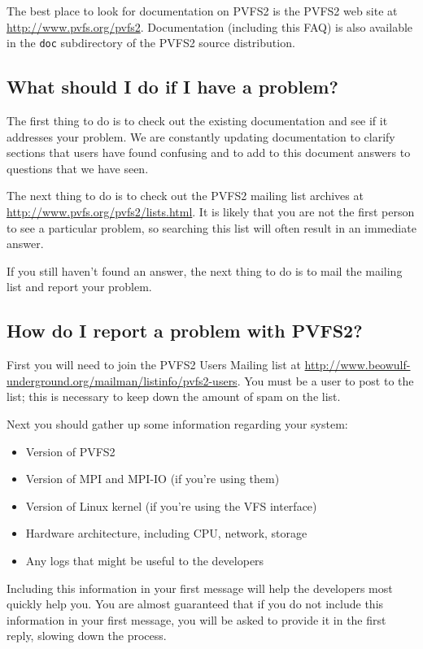 \documentclass[11pt,letterpaper]{article}
\begin{document}
The best place to look for documentation on PVFS2 is the PVFS2 web site at
\url{http://www.pvfs.org/pvfs2}.  Documentation (including this FAQ) is also
available in the \texttt{doc} subdirectory of the PVFS2 source distribution.

\subsection{What should I do if I have a problem?}

The first thing to do is to check out the existing documentation and see if it
addresses your problem.  We are constantly updating documentation to clarify
sections that users have found confusing and to add to this document answers
to questions that we have seen.

The next thing to do is to check out the PVFS2 mailing list archives at
\url{http://www.pvfs.org/pvfs2/lists.html}.  It is likely that you are not
the first person to see a particular problem, so searching this list will
often result in an immediate answer.

If you still haven't found an answer, the next thing to do is to mail the
mailing list and report your problem.

\subsection{How do I report a problem with PVFS2?}

First you will need to join the PVFS2 Users Mailing list at
\url{http://www.beowulf-underground.org/mailman/listinfo/pvfs2-users}.  You
must be a user to post to the list; this is necessary to keep down the amount
of spam on the list.

Next you should gather up some information regarding your system:
\begin{itemize}
\item Version of PVFS2
\item Version of MPI and MPI-IO (if you're using them)
\item Version of Linux kernel (if you're using the VFS interface)
\item Hardware architecture, including CPU, network, storage
\item Any logs that might be useful to the developers
\end{itemize}
Including this information in your first message will help the developers most
quickly help you.  You are almost guaranteed that if you do not include this
information in your first message, you will be asked to provide it in the
first reply, slowing down the process.
\end{document}
